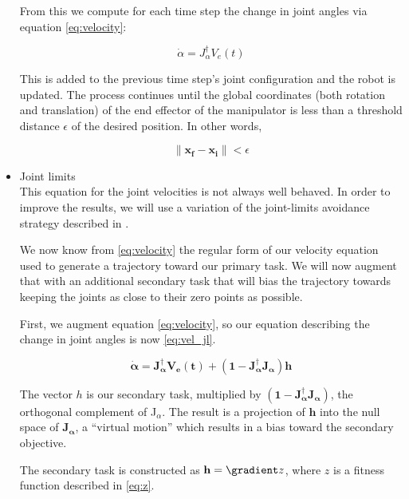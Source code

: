 \documentclass[10pt, conference]{IEEEtran}
\begin{document}
\begin{itemize}
     From this we compute for each time step the change in joint angles
     via equation \ref{eq:velocity}:

     \begin{equation}
     \label{eq:velocity}
     \dot{\alpha} = J_{\alpha}^{\dagger}V_e(t)
     \end{equation}

     This is added to the previous time step's joint configuration and
     the robot is updated. The process continues until the global
     coordinates (both rotation and translation) of the end effector
     of the manipulator is less than a threshold distance $\epsilon$
     of the desired position. In other words,

     \begin{equation}
     \label{eq:distance}
     \| \mathbf{x_f - x_i} \| < \epsilon
     \end{equation}


\item Joint limits\\
\label{sec-3-3-1-3}%
This equation for the joint velocities is not always well
     behaved. In order to improve the results, we will use a variation
     of the joint-limits avoidance strategy described in
     \cite{luc_baron}.

     We now know from \ref{eq:velocity} the regular form of our
     velocity equation used to generate a trajectory toward our primary
     task. We will now augment that with an additional secondary task
     that will bias the trajectory towards keeping the joints as close
     to their zero points as possible.

     First, we augment equation \ref{eq:velocity}, so our equation
     describing the change in joint angles is now \ref{eq:vel_jl}.

     \begin{equation}
     \label{eq:vel_jl}
     \mathbf{\dot{\alpha} = J_{\alpha}^{\dagger}V_e(t) + (1 -
     J_{\alpha}^{\dagger}J_{\alpha})h}
     \end{equation}

     The vector \(h\) is our secondary task, multiplied by \(\mathbf{
     (1 - J_{\alpha}^{\dagger}J_{\alpha})}\), the orthogonal complement
     of J$_{\alpha}$. The result is a projection of \(\mathbf{h}\) into
     the null space of \(\mathbf{J_\alpha}\), a ``virtual motion'' which
     results in a bias toward the secondary objective.

     The secondary task is constructed as  \(\mathbf{h} = \gradient z\),
     where \(z\) is a fitness function described in \ref{eq:z}.


\end{itemize}
\end{document}
